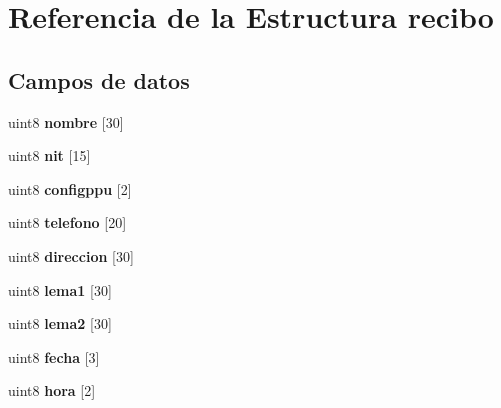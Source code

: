 \hypertarget{structrecibo}{}\section{Referencia de la Estructura recibo}
\label{structrecibo}
\subsection*{Campos de datos}
\begin{DoxyCompactItemize}
\item 
\mbox{\label{structrecibo_a46e829bcd14d57324eb96a3288f8fe41}} 
uint8 {\bfseries nombre} \mbox{[}30\mbox{]}
\item 
\mbox{\label{structrecibo_a1849f036555e982798ce8018a4bd9ac8}} 
uint8 {\bfseries nit} \mbox{[}15\mbox{]}
\item 
\mbox{\label{structrecibo_a0885fc20ed81dd3dfb10469441598d44}} 
uint8 {\bfseries configppu} \mbox{[}2\mbox{]}
\item 
\mbox{\label{structrecibo_a7c9fd91163815349156e4dcce7716bdf}} 
uint8 {\bfseries telefono} \mbox{[}20\mbox{]}
\item 
\mbox{\label{structrecibo_a556cb42b98ca3281993b47db2f56fc6e}} 
uint8 {\bfseries direccion} \mbox{[}30\mbox{]}
\item 
\mbox{\label{structrecibo_ae307e9a00a63bd47295d088572bbc9e7}} 
uint8 {\bfseries lema1} \mbox{[}30\mbox{]}
\item 
\mbox{\label{structrecibo_a1784e5cbbb0bffaa542b3c352a910d38}} 
uint8 {\bfseries lema2} \mbox{[}30\mbox{]}
\item 
\mbox{\label{structrecibo_a45b8e04bfea26030fccc0cde4888e869}} 
uint8 {\bfseries fecha} \mbox{[}3\mbox{]}
\item 
\mbox{\label{structrecibo_af03a13ef1dcc15bc76419be49b3e8401}} 
uint8 {\bfseries hora} \mbox{[}2\mbox{]}
\item 
\mbox{\label{structrecibo_a8388ec4ace5d12986a5f180d2ca69210}} 

\end{DoxyCompactItemize}
